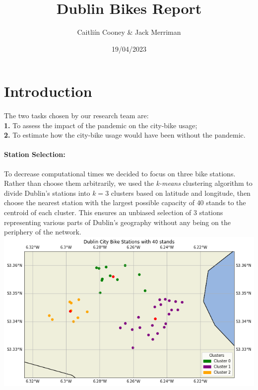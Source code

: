 \documentclass[12pt,letterpaper]{article}
\title{Dublin Bikes Report}
\date{19/04/2023}
\author{Caitliín Cooney \& Jack Merriman}
\begin{document}
\maketitle

	\section{Introduction}
	
	\paragraph{}
	\noindent The two tasks chosen by our research team are:\\
	\textbf{1.} To assess the impact of the pandemic on the city-bike usage;\\
	\textbf{2.} To estimate how the city-bike usage would have been without the pandemic.\\
	
	\paragraph{Station Selection:}
	To decrease computational times we decided to focus on three bike stations. Rather than choose them arbitrarily, we used the \textit{k-means} clustering algorithm to divide Dublin's stations into $k = 3$ clusters based on latitude and longitude, then choose the nearest station with the largest possible capacity of $40$ stands to the centroid of each cluster. This ensures an unbiased selection of 3 stations representing various parts of Dublin's geography without any being on the periphery of the network.\\
	
	\includegraphics[width=\textwidth]{kmeans.png}
	
	
	
	
\end{document}

